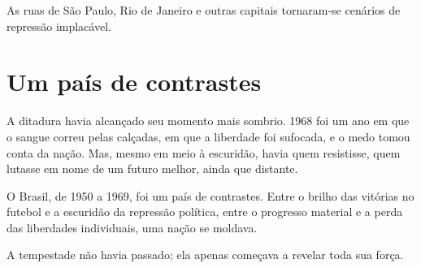 As ruas de São Paulo, Rio de Janeiro e outras capitais tornaram-se cenários de repressão implacável.

\section*{Um país de contrastes}

A ditadura havia alcançado seu momento mais sombrio. 1968 foi um ano em que o sangue correu pelas calçadas, em que a liberdade foi sufocada, e o medo tomou conta da nação. Mas, mesmo em meio à escuridão, havia quem resistisse, quem lutasse em nome de um futuro melhor, ainda que distante.

O Brasil, de 1950 a 1969, foi um país de contrastes. Entre o brilho das vitórias no futebol e a escuridão da repressão política, entre o progresso material e a perda das liberdades individuais, uma nação se moldava.

A tempestade não havia passado; ela apenas começava a revelar toda sua força.